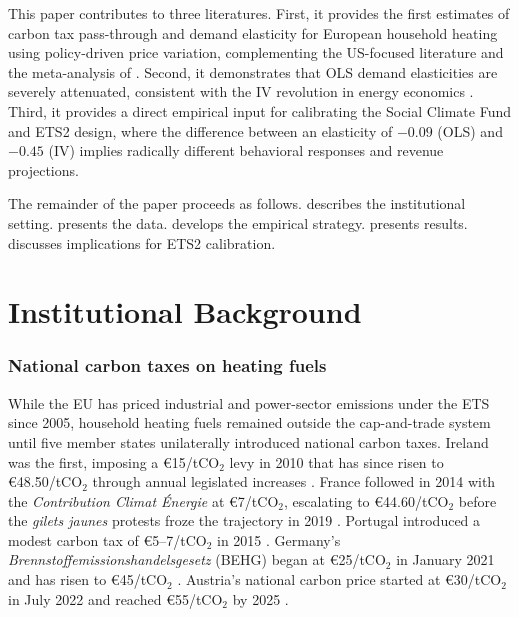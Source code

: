 \documentclass[12pt]{article}
\begin{document}
This paper contributes to three literatures. First, it provides the first estimates of carbon tax pass-through and demand elasticity for European household heating using policy-driven price variation, complementing the US-focused literature \citep{davis2014effect, ito2014sequential, alberini2011response} and the meta-analysis of \citet{labandeira2017meta}. Second, it demonstrates that OLS demand elasticities are severely attenuated, consistent with the IV revolution in energy economics \citep{hausman2001mismeasured, coglianese2017gasoline}. Third, it provides a direct empirical input for calibrating the Social Climate Fund and ETS2 design, where the difference between an elasticity of $-0.09$ (OLS) and $-0.45$ (IV) implies radically different behavioral responses and revenue projections.

The remainder of the paper proceeds as follows.  describes the institutional setting.  presents the data.  develops the empirical strategy.  presents results.  discusses implications for ETS2 calibration.


\section{Institutional Background}
\label{sec:background}

\subsubsection*{National carbon taxes on heating fuels} While the EU has priced industrial and power-sector emissions under the ETS since 2005, household heating fuels remained outside the cap-and-trade system until five member states unilaterally introduced national carbon taxes. Ireland was the first, imposing a \euro{}15/tCO$_2$ levy in 2010 that has since risen to \euro{}48.50/tCO$_2$ through annual legislated increases \citep{ireland_carbon_tax}. France followed in 2014 with the \textit{Contribution Climat \'Energie} at \euro{}7/tCO$_2$, escalating to \euro{}44.60/tCO$_2$ before the \textit{gilets jaunes} protests froze the trajectory in 2019 \citep{douenne2020french}. Portugal introduced a modest carbon tax of \euro{}5--7/tCO$_2$ in 2015 \citep{portugal_carbon_tax}. Germany's \textit{Brennstoffemissionshandelsgesetz} (BEHG) began at \euro{}25/tCO$_2$ in January 2021 and has risen to \euro{}45/tCO$_2$ \citep{germany_behg}. Austria's national carbon price started at \euro{}30/tCO$_2$ in July 2022 and reached \euro{}55/tCO$_2$ by 2025 \citep{austria_carbon_tax}.
\end{document}
